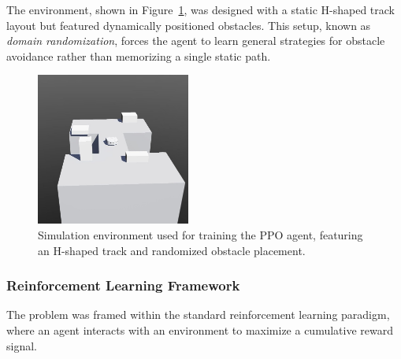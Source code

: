 \documentclass[final,5p,times,twocolumn,authoryear]{elsarticle}
\begin{document}
The environment, shown in Figure~\ref{fig:env_ppo}, was designed with a static H-shaped track layout but featured dynamically positioned obstacles. This setup, known as \textit{domain randomization}, forces the agent to learn general strategies for obstacle avoidance rather than memorizing a single static path.

\begin{figure}[H]
    \centering
    \includegraphics[width=0.45\textwidth]{figures/env2.png}
    \caption{Simulation environment used for training the PPO agent, featuring an H-shaped track and randomized obstacle placement.}
    \label{fig:env_ppo}
\end{figure}

\subsubsection{Reinforcement Learning Framework}

The problem was framed within the standard reinforcement learning paradigm, where an agent interacts with an environment to maximize a cumulative reward signal.
\end{document}
